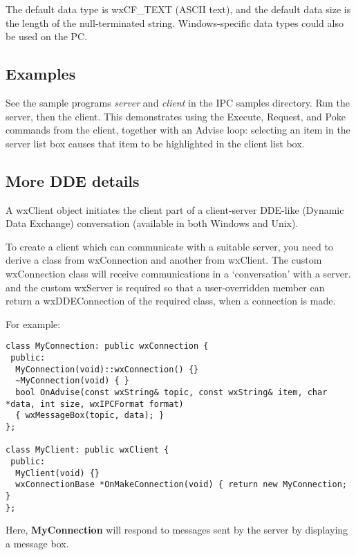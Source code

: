 The default data type is wxCF\_TEXT (ASCII text), and the default data
size is the length of the null-terminated string. Windows-specific data
types could also be used on the PC.

\subsection{Examples}\label{ipcexamples}

See the sample programs {\it server}\/ and {\it client}\/ in the IPC
samples directory.  Run the server, then the client. This demonstrates
using the Execute, Request, and Poke commands from the client, together
with an Advise loop: selecting an item in the server list box causes
that item to be highlighted in the client list box.

\subsection{More DDE details}\label{ddedetails}

A wxClient object initiates the client part of a client-server
DDE-like (Dynamic Data Exchange) conversation (available in both
Windows and Unix).

To create a client which can communicate with a suitable server,
you need to derive a class from wxConnection and another from
wxClient. The custom wxConnection class will receive
communications in a `conversation' with a server.  and the custom
wxServer is required so that a user-overridden
member can return a wxDDEConnection of the required class, when a
connection is made.

For example:

\begin{verbatim}
class MyConnection: public wxConnection {
 public:
  MyConnection(void)::wxConnection() {}
  ~MyConnection(void) { }
  bool OnAdvise(const wxString& topic, const wxString& item, char *data, int size, wxIPCFormat format)
  { wxMessageBox(topic, data); }
};

class MyClient: public wxClient {
 public:
  MyClient(void) {}
  wxConnectionBase *OnMakeConnection(void) { return new MyConnection; }
};

\end{verbatim}

Here, {\bf MyConnection} will respond to
 messages sent by the
server by displaying a message box.

